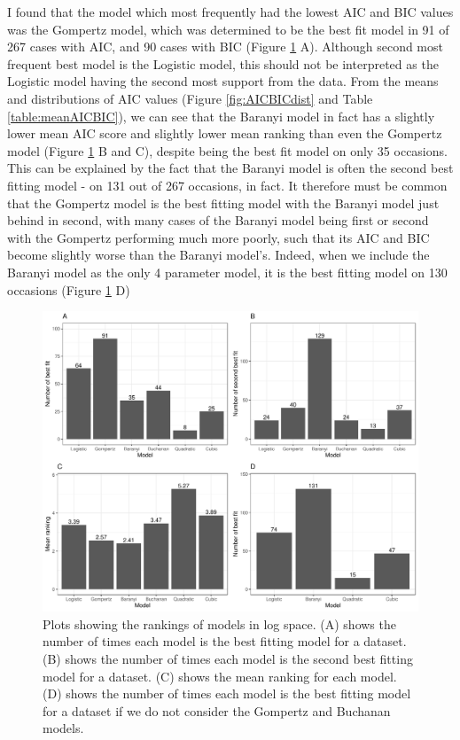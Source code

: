 \documentclass[11pt, a4paper]{article}
\begin{document}
\begin{linenumbers}
I found that the model which most frequently had the lowest AIC and BIC values was the Gompertz model, which was determined to be the best fit model in 91 of 267 cases with AIC, and 90 cases with BIC (Figure \ref{fig:bestbars} A). Although second most frequent best model is the Logistic model, this should not be interpreted as the Logistic model having the second most support from the data. From the means and distributions of AIC values (Figure \ref{fig:AICBICdist} and Table \ref{table:meanAICBIC}), we can see that the Baranyi model in fact has a slightly lower mean AIC score and slightly lower mean ranking than even the Gompertz model (Figure \ref{fig:bestbars} B and C), despite being the best fit model on only 35 occasions. This can be explained by the fact that the Baranyi model is  often the second best fitting model - on 131 out of 267 occasions, in fact. It therefore must be common that the Gompertz model is the best fitting model with the Baranyi model just behind in second, with many cases of the Baranyi model being first or second with the Gompertz performing much more poorly, such that its AIC and BIC become slightly worse than the Baranyi model's. Indeed, when we include the Baranyi model as the only 4 parameter model, it is the best fitting model on 130 occasions (Figure \ref{fig:bestbars} D)




        \begin{figure}[H]
        \includegraphics[width=\linewidth]{../results/best_fit_frequency_bar.pdf}
        \caption{Plots showing the rankings of models in log space. (A) shows the number of times each model is the best fitting model for a dataset. (B) shows the number of times each model is the second best fitting model for a dataset. (C) shows the mean ranking for each model. (D) shows the number of times each model is the best fitting model for a dataset if we do not consider the Gompertz and Buchanan models. }
        \label{fig:bestbars}
        \end{figure}
        

\end{linenumbers}
\end{document}
